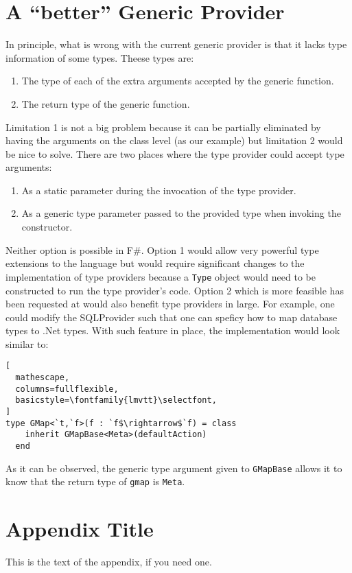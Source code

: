 \documentclass{sigplanconf}
\begin{document}
\section{A ``better'' Generic Provider}
In principle, what is wrong with the current generic provider is that
it lacks type information of some types. Theese types are:
\begin{enumerate}
\item The type of each of the extra arguments accepted by the generic function.
\item The return type of the generic function.
\end{enumerate}
Limitation 1 is not a big problem because it can be partially
eliminated by having the arguments on the class level (as our example)
but limitation 2 would be nice to solve. There are two places where
the type provider could accept type arguments:
\begin{enumerate}
\item As a static parameter during the invocation of the type provider.
\item As a generic type parameter passed to the provided type when invoking the constructor.
\end{enumerate}
Neither option is possible in F\#. Option 1 would allow very powerful
type extensions to the language but would require significant changes
to the implementation of type providers because a \verb+Type+ object
would need to be constructed to run the type provider's code. Option 2
which is more feasible has been requested at \cite{genericTypeArgs}
would also benefit type providers in large. For example, one could
modify the SQLProvider \cite{SQLProvider} such that one can speficy
how to map database types to .Net types. With such feature in place,
the implementation would look similar to:
\begin{lstlisting}[
  mathescape,
  columns=fullflexible,
  basicstyle=\fontfamily{lmvtt}\selectfont,
]
type GMap<`t,`f>(f : `f$\rightarrow$`f) = class
    inherit GMapBase<Meta>(defaultAction)
  end
\end{lstlisting}
As it can be observed, the generic type argument given to
\verb+GMapBase+ allows it to know that the return type of \verb+gmap+
is \verb+Meta+.

\appendix
\section{Appendix Title}

This is the text of the appendix, if you need one.
\end{document}
